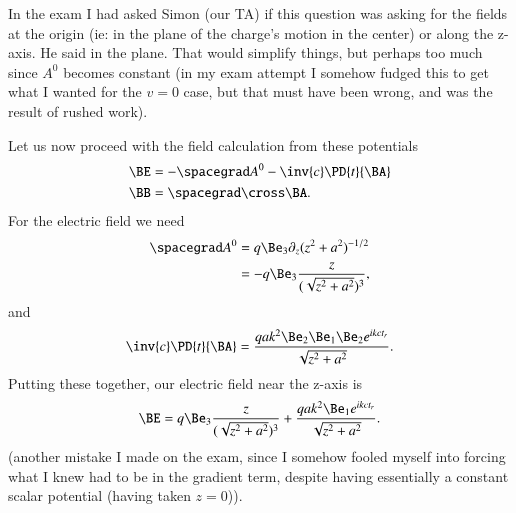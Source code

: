 {In the exam I had asked Simon (our TA) if this question was asking for the fields at the origin (ie: in the plane of the charge's motion in the center) or along the z-axis.  He said in the plane.  That would simplify things, but perhaps too much since \(A^0\) becomes constant (in my exam attempt I somehow fudged this to get what I wanted for the \(v = 0\) case, but that must have been wrong, and was the result of rushed work).

Let us now proceed with the field calculation from these potentials
%
\begin{equation}\label{eqn:relativisticElectrodynamicsExamReflection:190}
\begin{aligned}
\BE &= - \spacegrad A^0 - \inv{c} \PD{t}{\BA} \\
\BB &= \spacegrad \cross \BA.
\end{aligned}
\end{equation}
%
For the electric field we need
%
\begin{equation}\label{eqn:relativisticElectrodynamicsExamReflection:1170}
\begin{aligned}
\spacegrad A^0
&= q \Be_3 \partial_z (z^2 + a^2)^{-1/2} \\
&= -q \Be_3 \frac{z}{(\sqrt{z^2 + a^2})^3},
\end{aligned}
\end{equation}
%
and
%
\begin{equation}\label{eqn:relativisticElectrodynamicsExamReflection:210}
\inv{c} \PD{t}{\BA} =
\frac{q a k^2 \Be_2 \Be_1 \Be_2 e^{i k c t_r} }{\sqrt{z^2 + a^2}}.
\end{equation}
%
Putting these together, our electric field near the z-axis is
%
\begin{equation}\label{eqn:relativisticElectrodynamicsExamReflection:230}
\BE =
q \Be_3 \frac{z}{(\sqrt{z^2 + a^2})^3}
+
\frac{q a k^2 \Be_1 e^{i k c t_r} }{\sqrt{z^2 + a^2}}.
\end{equation}
%
(another mistake I made on the exam, since I somehow fooled myself into forcing what I knew had to be in the gradient term, despite having essentially a constant scalar potential (having taken \(z = 0\))).

}
